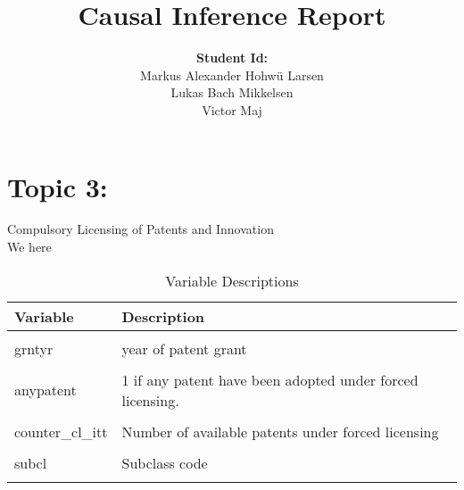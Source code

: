 \documentclass[
  12pt,
]{article}
\title{Causal Inference Report}
\author{\begin{center}\textbf{Student Id:}\end{center}
\raggedright

Markus Alexander Hohwü Larsen\\
Lukas Bach Mikkelsen\\
Victor Maj}
\date{}
\begin{document}
\maketitle

\newpage

\hypertarget{topic-3}{%
\section{\texorpdfstring{\textbf{Topic 3:}}{Topic 3:}}\label{topic-3}}

Compulsory Licensing of Patents and Innovation\\
We here

\vspace{1cm}
\begin{table}[!h]
\centering
\caption{\label{tab:unnamed-chunk-1}Variable Descriptions}
\centering
\begin{tabular}[t]{ll}
\toprule
Variable & Description\\
\midrule
\cellcolor{gray!10}{uspto\_class} & \cellcolor{gray!10}{specific technology grouping of patent based on common subject matter}\\
grntyr & year of patent grant\\
\cellcolor{gray!10}{count\_cl} & \cellcolor{gray!10}{Number of patents adopted under forced licensing}\\
anypatent & 1 if any patent have been adopted under forced licensing.\\
\cellcolor{gray!10}{count\_usa} & \cellcolor{gray!10}{Number of patents developed domestically}\\
\addlinespace
counter\_cl\_itt & Number of available patents under forced licensing\\
\cellcolor{gray!10}{mainclass\_id} & \cellcolor{gray!10}{Main class code}\\
subcl & Subclass code\\
\cellcolor{gray!10}{twea} & \cellcolor{gray!10}{Whether TWEA was enacted}\\
\bottomrule
\end{tabular}
\end{table}

\vspace*{\fill}
\end{document}
